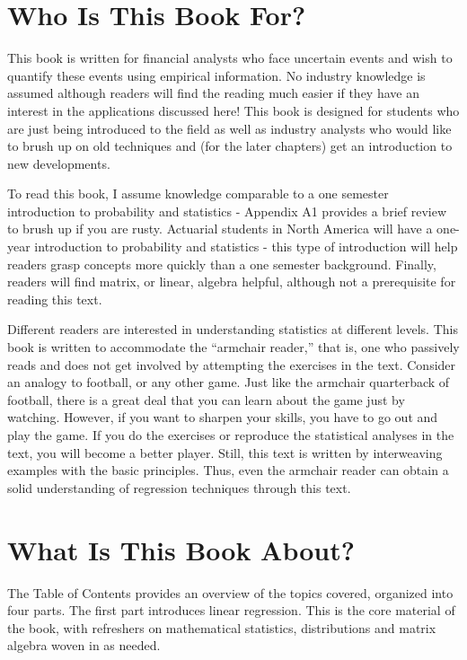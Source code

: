 \section*{Who Is This Book For?}

This book is written for financial analysts who face uncertain
events and wish to quantify these events using empirical
information. No industry knowledge is assumed although readers will
find the reading much easier if they have an interest in the
applications discussed here! This book is designed for students who
are just being introduced to the field as well as industry analysts
who would like to brush up on old techniques and (for the later
chapters) get an introduction to new developments.

To read this book, I assume knowledge comparable to a one semester
introduction to probability and statistics - Appendix A1 provides a
brief review to brush up if you are rusty. Actuarial students in
North America will have a one-year introduction to probability and
statistics - this type of introduction will help readers grasp
concepts more quickly than a one semester background. Finally,
readers will find matrix, or linear, algebra helpful, although not a
prerequisite for reading this text.

Different readers are interested in understanding statistics at
different levels. This book is written to accommodate the ``armchair
reader,'' that is, one who passively reads and does not get involved
by attempting the exercises in the text. Consider an analogy to
football, or any other game. Just like the armchair quarterback of
football, there is a great deal that you can learn about the game
just by watching. However, if you want to sharpen your skills, you
have to go out and play the game. If you do the exercises or
reproduce the statistical analyses in the text, you will become a
better player. Still, this text is written by interweaving examples
with the basic principles. Thus, even the armchair reader can obtain
a solid understanding of regression techniques through this text.

\section*{What Is This Book About?}

The Table of Contents provides an overview of the topics covered,
organized into four parts. The first part introduces linear
regression. This is the core material of the book, with refreshers
on mathematical statistics, distributions and matrix algebra woven
in as needed.

